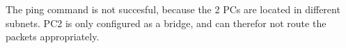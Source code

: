 The ping command is not succesful, because the 2 PCs are located in different subnets. PC2 is only configured as a bridge, and can therefor not route the packets appropriately.
